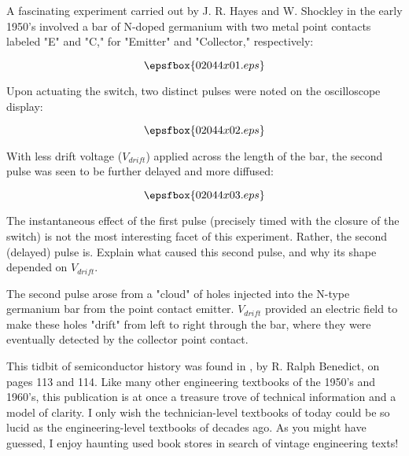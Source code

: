 

A fascinating experiment carried out by J. R. Hayes and W. Shockley in the early 1950's involved a bar of N-doped germanium with two metal point contacts labeled "E" and "C," for "Emitter" and "Collector," respectively:

$$\epsfbox{02044x01.eps}$$

Upon actuating the switch, two distinct pulses were noted on the oscilloscope display:

$$\epsfbox{02044x02.eps}$$

With less drift voltage ($V_{drift}$) applied across the length of the bar, the second pulse was seen to be further delayed and more diffused:

$$\epsfbox{02044x03.eps}$$

The instantaneous effect of the first pulse (precisely timed with the closure of the switch) is not the most interesting facet of this experiment.  Rather, the second (delayed) pulse is.  Explain what caused this second pulse, and why its shape depended on $V_{drift}$.







The second pulse arose from a "cloud" of holes injected into the N-type germanium bar from the point contact emitter.  $V_{drift}$ provided an electric field to make these holes "drift" from left to right through the bar, where they were eventually detected by the collector point contact.







This tidbit of semiconductor history was found in , by R. Ralph Benedict, on pages 113 and 114.  Like many other engineering textbooks of the 1950's and 1960's, this publication is at once a treasure trove of technical information and a model of clarity.  I only wish the technician-level textbooks of today could be so lucid as the engineering-level textbooks of decades ago.  As you might have guessed, I enjoy haunting used book stores in search of vintage engineering texts!




